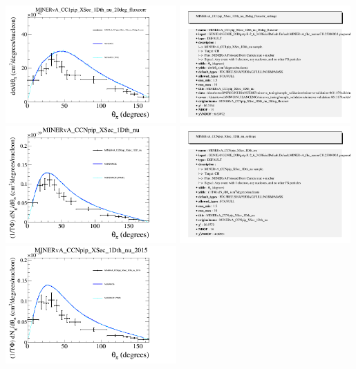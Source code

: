 \documentclass{article}
\begin{document}
\centering
\includegraphics[width=0.49\textwidth]{figures/nuisance_MINERvA_CC1pip_XSec_1Dth_nu_20deg_fluxcorr_comp.png}
\includegraphics[width=0.49\textwidth]{figures/nuisance_MINERvA_CC1pip_XSec_1Dth_nu_20deg_fluxcorr_info.png}
\centering
\includegraphics[width=0.49\textwidth]{figures/nuisance_MINERvA_CCNpip_XSec_1Dth_nu_comp.png}
\includegraphics[width=0.49\textwidth]{figures/nuisance_MINERvA_CCNpip_XSec_1Dth_nu_info.png}
\centering
\includegraphics[width=0.49\textwidth]{figures/nuisance_MINERvA_CCNpip_XSec_1Dth_nu_2015_comp.png}
\end{document}
